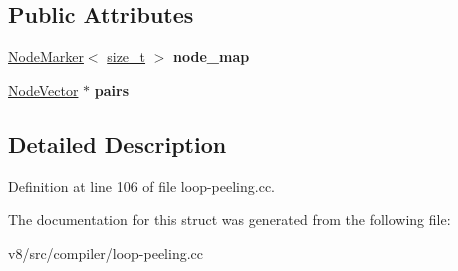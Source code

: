 \subsection*{Public Attributes}
\begin{DoxyCompactItemize}
\item 
\mbox{\label{structv8_1_1internal_1_1compiler_1_1Peeling_a17486dbe74dcb340c36d29853b401efd}} 
\mbox{\hyperlink{classv8_1_1internal_1_1compiler_1_1NodeMarker}{Node\+Marker}}$<$ \mbox{\hyperlink{classsize__t}{size\+\_\+t}} $>$ {\bfseries node\+\_\+map}
\item 
\mbox{\label{structv8_1_1internal_1_1compiler_1_1Peeling_a0567f90a9610ee19793e528d90f1478c}} 
\mbox{\hyperlink{classv8_1_1internal_1_1ZoneVector}{Node\+Vector}} $\ast$ {\bfseries pairs}
\end{DoxyCompactItemize}


\subsection{Detailed Description}


Definition at line 106 of file loop-\/peeling.\+cc.



The documentation for this struct was generated from the following file\+:\begin{DoxyCompactItemize}
\item 
v8/src/compiler/loop-\/peeling.\+cc\end{DoxyCompactItemize}
